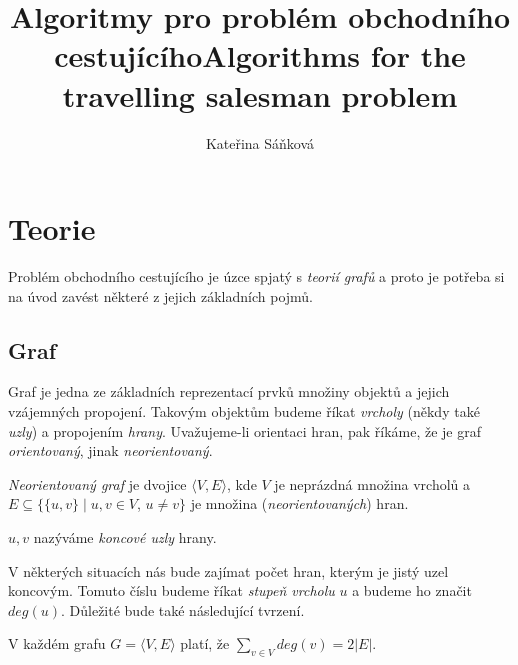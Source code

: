 \documentclass[
  biblatex,
  figures=false,
  glossaries,
  index
]{kidiplom}
\title{Algoritmy pro problém obchodního cestujícího}
\title[english]{Algorithms for the travelling salesman problem}
\author{Kateřina Sáňková}
\begin{document}
\maketitle



\newcommand{\BibLaTeX}{\textsc{Bib}\LaTeX}

\section{Teorie}
Problém obchodního cestujícího je úzce spjatý s \textit{teorií grafů} a proto je potřeba si na úvod zavést některé z jejich základních pojmů.

\subsection{Graf}
Graf je jedna ze základních reprezentací prvků množiny objektů a jejich vzájemných propojení. Takovým objektům budeme říkat \textit{vrcholy} (někdy také \textit{uzly}) a propojením \textit{hrany}. Uvažujeme-li orientaci hran, pak říkáme, že je graf \textit{orientovaný}, jinak \textit{neorientovaný}.

\begin{definition}
\textit{Neorientovaný graf} je dvojice $\langle V, E \rangle$, kde $V$ je neprázdná množina vrcholů a $E \subseteq \{\{u, v\} \mid u, v \in V$, $u \neq v \}$ je množina (\textit{neorientovaných}) hran.

$u, v$ nazýváme \textit{koncové uzly} hrany.
\end{definition}
 
V některých situacích nás bude zajímat počet hran, kterým je jistý uzel koncovým. Tomuto číslu budeme říkat \textit{stupeň vrcholu} $u$ a budeme ho značit $deg(u)$. Důležité bude také následující tvrzení.

\begin{theorem}\label{theorem:degree}
V každém grafu $G=\langle V, E \rangle$ platí, že $\sum_{v \in V} deg(v) = 2 |E|$.
\end{theorem}
\end{document}

